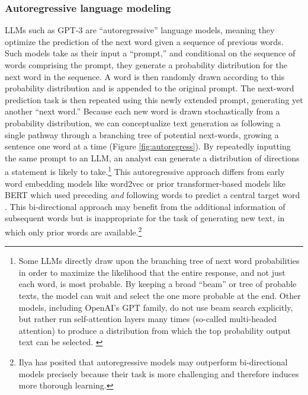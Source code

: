 \documentclass{article} %
\begin{document}
\subsubsection*{Autoregressive language modeling}

LLMs such as GPT-3 are ``autoregressive'' language models, meaning they
optimize the prediction of the next word given a sequence of previous
words. Such models take as their input a ``prompt,'' and conditional on
the sequence of words comprising the prompt, they generate a probability
distribution for the next word in the sequence. A word is then randomly
drawn according to this probability distribution and is appended to the
original prompt. The next-word prediction task is then repeated using
this newly extended prompt, generating yet another ``next word.''
Because each new word is drawn stochastically from a probability
distribution, we can conceptualize text generation as following a single
pathway through a branching tree of potential next-words, growing a
sentence one word at a time (Figure \ref{fig:autoregress}). By repeatedly inputting the same
prompt to an LLM, an analyst can generate a distribution of directions a
statement is likely to take.\footnote{Some LLMs directly draw upon the
  branching tree of next word probabilities in order to maximize the
  likelihood that the entire response, and not just each word, is most
  probable. By keeping a broad ``beam'' or tree of probable texts, the
  model can wait and select the one more probable at the end. Other
  models, including OpenAI's GPT family, do not use beam search
  explicitly, but rather run self-attention layers many times (so-called
  multi-headed attention) to produce a distribution from which the top
  probability output text can be selected. \hl{}} This autoregressive
approach differs from early word embedding models like word2vec or prior
transformer-based models like BERT which used preceding \emph{and}
following words to predict a central target word
\parencite{Devlin2018-um, Mikolov2013-va}. This bi-directional approach may benefit from the
additional information of subsequent words but is inappropriate for the
task of generating new text, in which only prior words are
available.\footnote{Ilya \citet{Sutskever2023-sa} has
  posited that autoregressive models may outperform bi-directional
  models precisely because their task is more challenging and therefore
  induces more thorough learning.}
\end{document}
